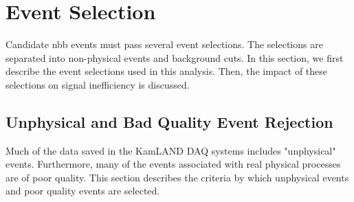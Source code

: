 \section{Event Selection}
Candidate \0nbb events must pass several event selections. The selections are separated into non-physical events and background cuts. In this section, we first describe the event selections used in this analysis. Then, the impact of these selections on signal inefficiency is discussed.

\subsection{Unphysical and Bad Quality Event Rejection}
\label{sec:badqualityevents}
Much of the data saved in the KamLAND DAQ systems includes "unphysical" events. Furthermore, many of the events associated with real physical processes are of poor quality. This section describes the criteria by which unphysical events and poor quality events are selected.
